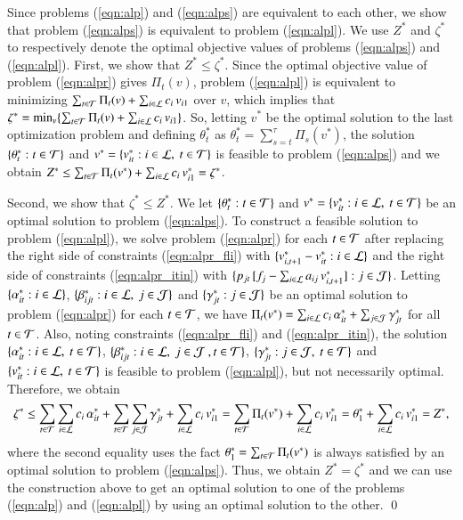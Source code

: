 Since problems (\ref{eqn:alp}) and (\ref{eqn:alps}) are equivalent to each other, we show that problem (\ref{eqn:alps}) is equivalent to problem (\ref{eqn:alpl}). We use $Z^*$ and $\zeta^*$ to respectively denote the optimal objective values of problems (\ref{eqn:alps}) and (\ref{eqn:alpl}). 
%
%
First, we show that $Z^* \leq \zeta^*$. Since the optimal objective value of problem (\ref{eqn:alpr}) gives $\Pi_t(v)$, problem (\ref{eqn:alpl}) is equivalent to minimizing $\sum_{t \in {\cal T}} \Pi_t(v) + \sum_{i \in {\cal L}} c_i {\,} v_{i1}$ over $v$, which implies that 
%
%
$\zeta^* = \min_v \{ \sum_{t \in {\cal T}} \Pi_t(v) + \sum_{i \in {\cal L}} c_i {\,} v_{i1}  \}$.
%
%
So, letting $v^*$ be the optimal solution to the last optimization problem and defining $\theta_t^*$ as $\theta_t^* = \sum_{s=t}^\tau \Pi_s(v^*)$, the solution $\{ \theta_t^* :  t \in {\cal T}\}$ and $v^* = \mbox{$\{ v_{it}^*: i \in {\cal L},~t \in {\cal T}\}$}$ is feasible to problem (\ref{eqn:alps}) and we obtain $Z^* \leq  \sum_{t \in {\cal T}} \Pi_t(v^*) + \sum_{i \in {\cal L}} c_i {\,} v_{i1}^* = \zeta^*$. 



Second, we show that $\zeta^* \leq Z^*$. We let $\{ \theta^*_t  : t \in {\cal T}\}$ and $v^* = \{ v^*_{it} : i \in {\cal L},~ t \in {\cal T}\}$ be an optimal solution to problem (\ref{eqn:alps}). To construct a feasible solution to problem (\ref{eqn:alpl}), we solve problem (\ref{eqn:alpr}) for each $t \in {\cal T}$ after replacing the right side of constraints (\ref{eqn:alpr_fli}) with $\{ v^*_{i,t+1} - v^*_{it} : i \in {\cal L}\}$ and the right side of constraints (\ref{eqn:alpr_itin}) with $\{ p_{jt} {\,} [ f_j - \sum_{i \in {\cal L}} a_{ij} {\,} v^*_{i,t+1} ] : j \in {\cal J}\}$. Letting $\{ \alpha^*_{it} : i \in {\cal L}\}$, $\{ \beta^*_{ijt} : i \in {\cal L},~ j \in {\cal J}\}$ and $\{ \gamma^*_{jt} : j \in {\cal J}\}$ be an optimal solution to problem (\ref{eqn:alpr}) for each $t \in {\cal T}$, we have $\Pi_t(v^*) = \sum_{i \in {\cal L}} c_i {\,} \alpha^*_{it} + \sum_{j \in {\cal J}} \gamma^*_{jt}$ for all $t \in {\cal T}$. Also, noting constraints (\ref{eqn:alpr_fli}) and (\ref{eqn:alpr_itin}), the solution $\{ \alpha^*_{it} : i \in {\cal L},~ t \in {\cal T}\}$, $\{ \beta^*_{ijt} : i \in {\cal L},~ j \in {\cal J}~, t \in {\cal T}\}$, $\{ \gamma^*_{jt} : j \in {\cal J},~ t \in {\cal T}\}$ and $\{v^*_{it} : i \in {\cal L},~ t \in {\cal T}\}$ is feasible to problem (\ref{eqn:alpl}), but not necessarily optimal. Therefore, we obtain 
%
%
\begin{align*}
\zeta^* \leq \sum_{t \in {\cal T}} \sum_{i \in {\cal L}} c_i {\,} \alpha^*_{it} + \sum_{t \in {\cal T}} \sum_{j \in {\cal J}} \gamma^*_{jt} + \sum_{i \in {\cal L}} c_i {\,} v^*_{i1}
=
\sum_{t \in {\cal T}} \Pi_t(v^*) + \sum_{i \in {\cal L}} c_i {\,} v^*_{i1}
=
\theta^*_1 + \sum_{i \in {\cal L}} c_i {\,} v^*_{i1} = Z^*,
\end{align*}
%
%
where the second equality uses the fact $\theta^*_1 = \sum_{t \in {\cal T}} \Pi_t(v^*)$ is always satisfied by an optimal solution to problem (\ref{eqn:alps}). Thus, we obtain $Z^* = \zeta^*$ and we can use the construction above to get an optimal solution to one of the problems (\ref{eqn:alp}) and (\ref{eqn:alpl}) by using an optimal solution to the other. \qed


